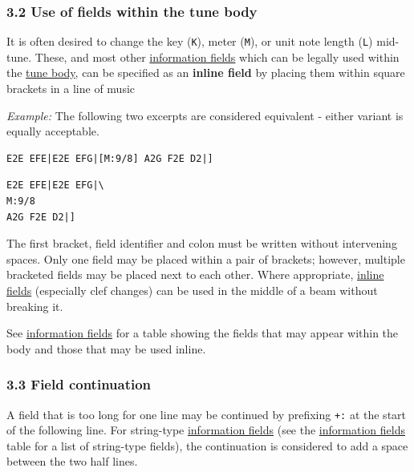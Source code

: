 \documentclass[oneside]{book}
\begin{document}
\hypertarget{use_of_fields_within_the_tune_body}{\subsubsection{3.2 Use
of fields within the tune
body}\label{use_of_fields_within_the_tune_body}}

\href{}{}It is often desired to change the key (\texttt{K}), meter
(\texttt{M}), or unit note length (\texttt{L}) mid-tune. These, and most
other \protect\hyperlink{information_field_definition}{information
fields} which can be legally used within the
\protect\hyperlink{tune_body_definition}{tune body}, can be specified as
an \textbf{inline field} by placing them within square brackets in a
line of music

\emph{Example:} The following two excerpts are considered equivalent -
either variant is equally acceptable.

\begin{verbatim}
E2E EFE|E2E EFG|[M:9/8] A2G F2E D2|]
\end{verbatim}

\begin{verbatim}
E2E EFE|E2E EFG|\
M:9/8
A2G F2E D2|]
\end{verbatim}

The first bracket, field identifier and colon must be written without
intervening spaces. Only one field may be placed within a pair of
brackets; however, multiple bracketed fields may be placed next to each
other. Where appropriate,
\protect\hyperlink{inline_field_definition}{inline fields} (especially
clef changes) can be used in the middle of a beam without breaking it.

See \protect\hyperlink{information_fields}{information fields} for a
table showing the fields that may appear within the body and those that
may be used inline.

\hypertarget{field_continuation}{\subsubsection{3.3 Field
continuation}\label{field_continuation}}

A field that is too long for one line may be continued by prefixing
\texttt{+:} at the start of the following line. For string-type
\protect\hyperlink{information_field_definition}{information fields}
(see the \protect\hyperlink{information_fields}{information fields}
table for a list of string-type fields), the continuation is considered
to add a space between the two half lines.
\end{document}
